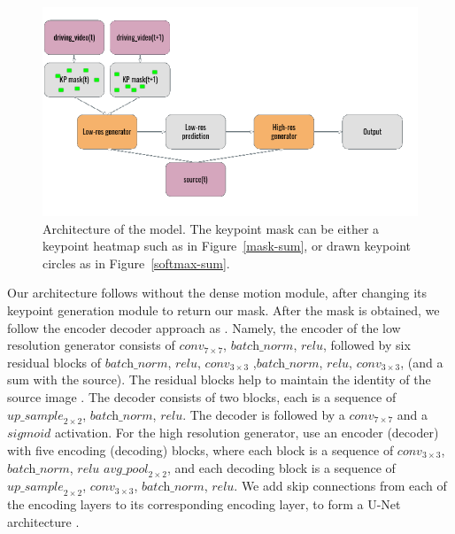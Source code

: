 \documentclass{article}
\begin{document}
\begin{figure}[ht]
\vskip 0.2in
\begin{center}
\centerline{\includegraphics[width=\columnwidth]{visualizations/architecture}}
\caption{Architecture of the model. The keypoint mask can be either a
keypoint heatmap such as in Figure~\ref{mask-sum}, or drawn keypoint
circles as in Figure~\ref{softmax-sum}.}
\label{arch}
\end{center}
\vskip -0.2in
\end{figure}

Our architecture follows \cite{siarohin2020order} without the dense
motion module, after changing its keypoint generation module to return our
mask. After the mask is obtained, we follow the encoder decoder approach as
\cite{shalev2020image}.
Namely, the encoder of the low resolution generator consists of $\textit{conv}_{7
\times 7}$, $\textit{batch\_norm}$, $\textit{relu}$, followed by six
residual blocks of $\textit{batch\_norm}$, $\textit{relu}$,
$\textit{conv}_{3 \times 3}$ ,$\textit{batch\_norm}$, $\textit{relu}$,
$\textit{conv}_{3 \times 3}$, (and a sum with the source).
The residual blocks help to maintain the identity of the source image
\cite{he2015deep}.
The decoder consists of two blocks, each is a sequence of
$\textit{up\_sample}_{2 \times 2 }$, $\textit{batch\_norm}$,
$\textit{relu}$. The decoder is followed by a $\textit{conv}_{7 \times 7}$
and a $\textit{sigmoid}$ activation.
For the high resolution generator, use an encoder (decoder) with five encoding (decoding) blocks,
where each block is a sequence of
$\textit{conv}_{3 \times 3}$, $\textit{batch\_norm}$, $\textit{relu}$
$\textit{avg\_pool}_{2 \times 2}$, and each decoding block is a sequence of
$\textit{up\_sample}_{2 \times 2}$, $\textit{conv}_{3 \times 3}$,
$\textit{batch\_norm}$, $\textit{relu}$.
We add skip connections from each of the encoding layers to its
corresponding encoding layer, to form a U-Net architecture
\cite{ronneberger2015unet}.
\end{document}
